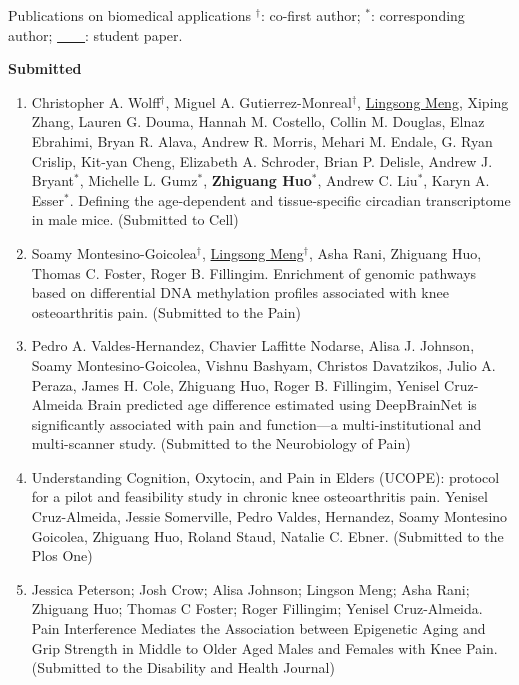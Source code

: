 \documentclass{resume} %
\begin{document}
\begin{rSection}{Publications on biomedical applications}
$^\dagger$: co-first author; $^*$: corresponding author; \underline{\mbox{ }\mbox{ }\mbox{ }\mbox{ }}: student paper.


\textbf{Submitted}
\begin{enumerate}[noitemsep,topsep=0pt]

\item 
Christopher A. Wolff$^\dagger$, Miguel A. Gutierrez-Monreal$^\dagger$, \underline{Lingsong Meng}, Xiping Zhang, Lauren G. Douma, Hannah M. Costello, Collin M. Douglas, Elnaz Ebrahimi, Bryan R. Alava, Andrew R. Morris, Mehari M. Endale, G. Ryan Crislip, Kit-yan Cheng, Elizabeth A. Schroder, Brian P. Delisle, Andrew J. Bryant$^*$, Michelle L. Gumz$^*$, {\bf Zhiguang Huo}$^*$, Andrew C. Liu$^*$, Karyn A. Esser$^*$.
Defining the age-dependent and tissue-specific circadian transcriptome in male mice.
(Submitted to Cell)

\item Soamy Montesino-Goicolea$^\dagger$, \underline{Lingsong Meng}$^\dagger$, Asha Rani, Zhiguang Huo, Thomas C. Foster, Roger B. Fillingim.
Enrichment of genomic pathways based on differential DNA methylation profiles associated with knee osteoarthritis pain.
(Submitted to the Pain)

\item 
Pedro A. Valdes-Hernandez, Chavier Laffitte Nodarse, Alisa J. Johnson, Soamy  Montesino-Goicolea, Vishnu Bashyam, Christos Davatzikos, Julio A. Peraza, James H. Cole, Zhiguang Huo, Roger B. Fillingim, Yenisel Cruz-Almeida
Brain predicted age difference estimated using DeepBrainNet is significantly associated with pain and function—a multi-institutional and multi-scanner study.
(Submitted to the Neurobiology of Pain)


\item 
Understanding Cognition, Oxytocin, and Pain in Elders (UCOPE): protocol for a pilot and feasibility study in chronic knee osteoarthritis pain. 
Yenisel Cruz-Almeida, Jessie Somerville, Pedro Valdes, Hernandez, Soamy Montesino Goicolea, Zhiguang Huo, Roland Staud, Natalie C. Ebner.
(Submitted to the Plos One)

\item 
Jessica Peterson; Josh Crow; Alisa Johnson; Lingson Meng; Asha Rani; Zhiguang Huo; Thomas C Foster; Roger Fillingim; Yenisel Cruz-Almeida.
Pain Interference Mediates the Association between Epigenetic Aging and Grip Strength in Middle to Older Aged Males and Females with Knee Pain.
(Submitted to the Disability and Health Journal)



\end{enumerate}
\end{rSection}
\end{document}
